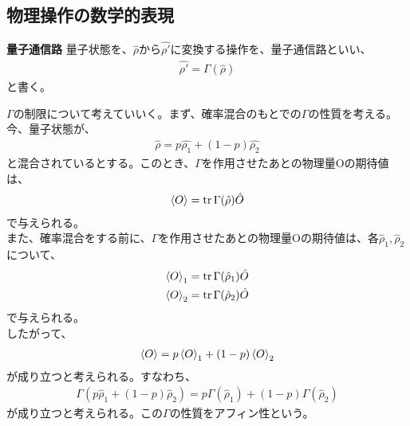 \documentclass[a4paper,11pt]{jsarticle}
\begin{document}
\subsection{物理操作の数学的表現}
\begin{itembox}[l]{\textbf{量子通信路}}
    量子状態を、$\hat{\rho}から\hat{\rho'}$に変換する操作を、量子通信路といい、
    \begin{align}
        \hat{\rho'} = \Gamma(\hat{\rho})
    \end{align}
    と書く。
\end{itembox}
$\Gamma$の制限について考えていいく。まず、確率混合のもとでの$\Gamma$の性質を考える。\\
今、量子状態が、
\begin{align}
    \hat{\rho} = p\hat{\rho_1} + (1-p)\hat{\rho_2}
\end{align}
と混合されているとする。このとき、$\Gamma$を作用させたあとの物理量Oの期待値は、
\begin{align}
    \ev{O} = \trace{\Gamma(\hat{\rho})\hat{O}}
\end{align}
で与えられる。\\
また、確率混合をする前に、$\Gamma$を作用させたあとの物理量Oの期待値は、各$\hat{\rho}_1,\hat{\rho}_2$について、
\begin{align}
    \ev{O}_1 = \trace{\Gamma(\hat{\rho}_1)\hat{O}}\\
    \ev{O}_2 = \trace{\Gamma(\hat{\rho}_2)\hat{O}}
\end{align}
で与えられる。\\
したがって、
\begin{align}
    \ev{O} = p\ev{O}_1 + (1-p)\ev{O}_2
\end{align}
が成り立つと考えられる。すなわち、
\begin{align}
    \Gamma(p\hat{\rho}_1 + (1-p)\hat{\rho}_2) = p\Gamma(\hat{\rho}_1) + (1-p)\Gamma(\hat{\rho}_2)
\end{align}
が成り立つと考えられる。この$\Gamma$の性質をアフィン性という。\\
\end{document}
